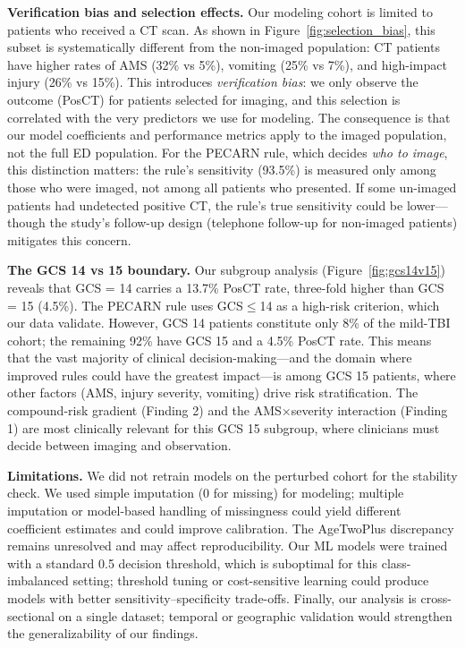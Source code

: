 \documentclass[12ptpt,letterpaper]{article}
\begin{document}
\textbf{Verification bias and selection effects.} Our modeling cohort is limited to patients who received a CT scan. As shown in Figure~\ref{fig:selection_bias}, this subset is systematically different from the non-imaged population: CT patients have higher rates of AMS (32\% vs 5\%), vomiting (25\% vs 7\%), and high-impact injury (26\% vs 15\%). This introduces \emph{verification bias}: we only observe the outcome (PosCT) for patients selected for imaging, and this selection is correlated with the very predictors we use for modeling. The consequence is that our model coefficients and performance metrics apply to the imaged population, not the full ED population. For the PECARN rule, which decides \emph{who to image}, this distinction matters: the rule's sensitivity (93.5\%) is measured only among those who were imaged, not among all patients who presented. If some un-imaged patients had undetected positive CT, the rule's true sensitivity could be lower---though the study's follow-up design (telephone follow-up for non-imaged patients) mitigates this concern.

\textbf{The GCS 14 vs 15 boundary.} Our subgroup analysis (Figure~\ref{fig:gcs14v15}) reveals that GCS = 14 carries a 13.7\% PosCT rate, three-fold higher than GCS = 15 (4.5\%). The PECARN rule uses GCS$\le$14 as a high-risk criterion, which our data validate. However, GCS 14 patients constitute only 8\% of the mild-TBI cohort; the remaining 92\% have GCS 15 and a 4.5\% PosCT rate. This means that the vast majority of clinical decision-making---and the domain where improved rules could have the greatest impact---is among GCS 15 patients, where other factors (AMS, injury severity, vomiting) drive risk stratification. The compound-risk gradient (Finding 2) and the AMS$\times$severity interaction (Finding 1) are most clinically relevant for this GCS 15 subgroup, where clinicians must decide between imaging and observation.

\textbf{Limitations.} We did not retrain models on the perturbed cohort for the stability check. We used simple imputation (0 for missing) for modeling; multiple imputation or model-based handling of missingness could yield different coefficient estimates and could improve calibration. The AgeTwoPlus discrepancy remains unresolved and may affect reproducibility. Our ML models were trained with a standard 0.5 decision threshold, which is suboptimal for this class-imbalanced setting; threshold tuning or cost-sensitive learning could produce models with better sensitivity--specificity trade-offs. Finally, our analysis is cross-sectional on a single dataset; temporal or geographic validation would strengthen the generalizability of our findings.
\end{document}

